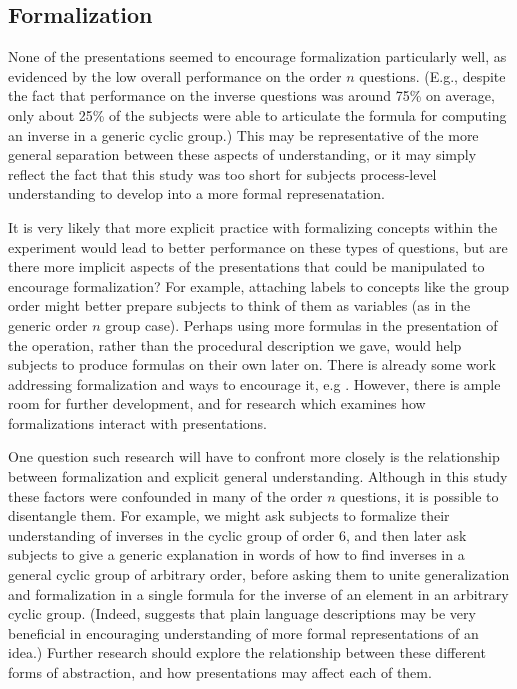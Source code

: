 \documentclass[man,10pt]{apa6}
\begin{document}
\subsection{Formalization}
None of the presentations seemed to encourage formalization particularly well, as evidenced by the low overall performance on the order $n$ questions. (E.g., despite the fact that performance on the inverse questions was around 75\% on average, only about 25\% of the subjects were able to articulate the formula for computing an inverse in a generic cyclic group.) This may be representative of the more general separation between these aspects of understanding, or it may simply reflect the fact that this study was too short for subjects process-level understanding to develop into a more formal represenatation.  \par
It is very likely that more explicit practice with formalizing concepts within the experiment would lead to better performance on these types of questions, but are there more implicit aspects of the presentations that could be manipulated to encourage formalization? For example, attaching labels to concepts like the group order might better prepare subjects to think of them as variables (as in the generic order $n$ group case). Perhaps using more formulas in the presentation of the operation, rather than the procedural description we gave, would help subjects to produce formulas on their own later on. There is already some work addressing formalization and ways to encourage it, e.g \cite{Nathan2012}. However, there is ample room for further development, and for research which examines how formalizations interact with presentations. \par
One question such research will have to confront more closely is the relationship between formalization and explicit general understanding. Although in this study these factors were confounded in many of the order $n$ questions, it is possible to disentangle them. For example, we might ask subjects to formalize their understanding of inverses in the cyclic group of order 6, and then later ask subjects to give a generic explanation in words of how to find inverses in a general cyclic group of arbitrary order, before asking them to unite generalization and formalization in a single formula for the inverse of an element in an arbitrary cyclic group. (Indeed, \cite{Nathan2012} suggests that plain language descriptions may be very beneficial in encouraging understanding of more formal representations of an idea.) Further research should explore the relationship between these different forms of abstraction, and how presentations may affect each of them.
\end{document}
